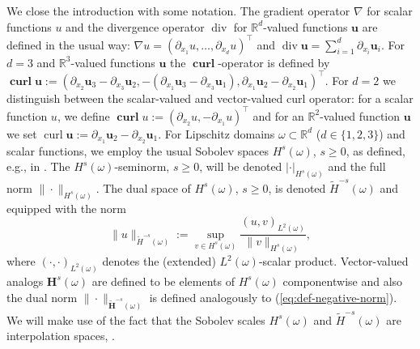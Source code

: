 \documentclass{article}
\begin{document}
We close the introduction with some notation. 
The gradient operator $\nabla$ for scalar functions $u$ and the divergence operator $\operatorname{div}$ for $\mathbb{R}^d$-valued functions $\mathbf{u}$ are defined in the usual way: $\nabla u = (\partial_{x_1} u,\ldots,\partial_{x_d} u)^\top$ and $\operatorname{div} {\mathbf u} = \sum_{i=1}^d \partial_{x_i} {\mathbf u}_i$. 
For $d = 3$ and ${\mathbb R}^3$-valued functions ${\mathbf u}$
the $\operatorname{\mathbf{curl}}$-operator is defined by 
$\operatorname{\mathbf{curl}} {\mathbf u} := 
(\partial_{x_2} {\mathbf u}_3 - \partial_{x_3} {\mathbf u}_2, 
-(\partial_{x_1} {\mathbf u}_3 - \partial_{x_3} {\mathbf u}_1), 
\partial_{x_1} {\mathbf u}_2 - \partial_{x_2} {\mathbf u}_1)^\top$. 
For $d = 2$ we distinguish between the scalar-valued and vector-valued curl operator: 
for a scalar function $u$, we define 
$\operatorname{\mathbf{curl}} u := (\partial_{x_2} u,-\partial_{x_1} u)^\top$
and for an ${\mathbb R}^2$-valued function ${\mathbf u}$ 
we set $\operatorname{{curl}} {\mathbf u} := \partial_{x_1} {\mathbf u}_2-\partial_{x_2} {\mathbf u}_1$. 
% 
For Lipschitz domains $\omega \subset {\mathbb R}^d$ ($d \in \{1,2,3\}$) and 
scalar functions, we employ the usual Sobolev spaces $H^s(\omega)$, $s \ge 0$, as defined, e.g., in
\cite{Mclean00}. 
The $H^s(\omega)$-seminorm, $s \ge 0$, will be denoted 
$|\cdot|_{H^s(\omega)}$ and the full norm 
$\|\cdot\|_{H^s(\omega)}$. The dual space of $H^s(\omega)$, $s \ge 0$, 
is denoted $\widetilde H^{-s}(\omega)$ and equipped with the norm 
\begin{equation}
\label{eq:def-negative-norm}
\|u\|_{\widetilde H^{-s}(\omega)}:= \sup_{v \in H^s(\omega)} \frac{(u,v)_{L^2(\omega)}}{\|v\|_{H^s(\omega)}},
\end{equation}
where $(\cdot,\cdot)_{L^2(\omega)}$ denotes the (extended) $L^2(\omega)$-scalar product. 
Vector-valued analogs ${\mathbf H}^s(\omega)$ are defined to be elements of 
$H^s(\omega)$ componentwise and also the dual norm 
$\|\cdot\|_{\widetilde {\mathbf H}^{-s}(\omega)}$ is defined analogously to 
(\ref{eq:def-negative-norm}). 
We will make use of the fact that the Sobolev scales $H^s(\omega)$ 
and $\widetilde H^{-s}(\omega)$ are interpolation spaces, \cite{Mclean00}.
\end{document}
